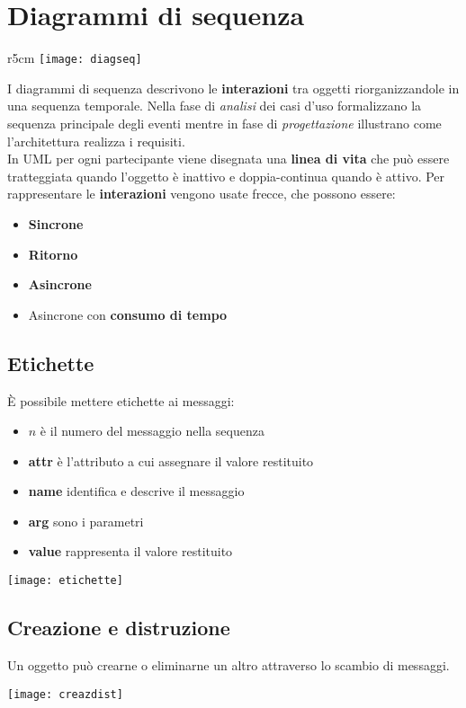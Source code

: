 \newpage
\section{Diagrammi di sequenza}
\begin{wrapfigure}[10]{r}{5cm}
	\texttt{[image: diagseq]}
\end{wrapfigure}
I diagrammi di sequenza descrivono le \textbf{interazioni} tra oggetti riorganizzandole in una sequenza temporale. Nella fase di \textit{analisi} dei casi d'uso formalizzano la sequenza principale  degli eventi mentre in fase di \textit{progettazione} illustrano come l'architettura realizza i requisiti.\\

In UML per ogni partecipante viene disegnata una \textbf{linea di vita} che può essere tratteggiata quando l'oggetto è inattivo e doppia-continua quando è attivo. Per rappresentare le \textbf{interazioni} vengono usate frecce, che possono essere:
\begin{itemize}
	\item \textbf{Sincrone}
	\item \textbf{Ritorno}
	\item \textbf{Asincrone}
	\item Asincrone con \textbf{consumo di tempo}
\end{itemize}

\subsection{Etichette}
È possibile mettere etichette ai messaggi:
\begin{itemize}
	\item $n$ è il numero del messaggio nella sequenza
	\item \textbf{attr} è l'attributo a cui assegnare il valore restituito
	\item \textbf{name} identifica e descrive il messaggio
	\item \textbf{arg} sono i parametri
	\item \textbf{value} rappresenta il valore restituito
\end{itemize}
\begin{center}
	\texttt{[image: etichette]}
\end{center}

\subsection{Creazione e distruzione}
Un oggetto può crearne o eliminarne un altro attraverso lo scambio di messaggi.
\begin{center}
	\texttt{[image: creazdist]}
\end{center}

